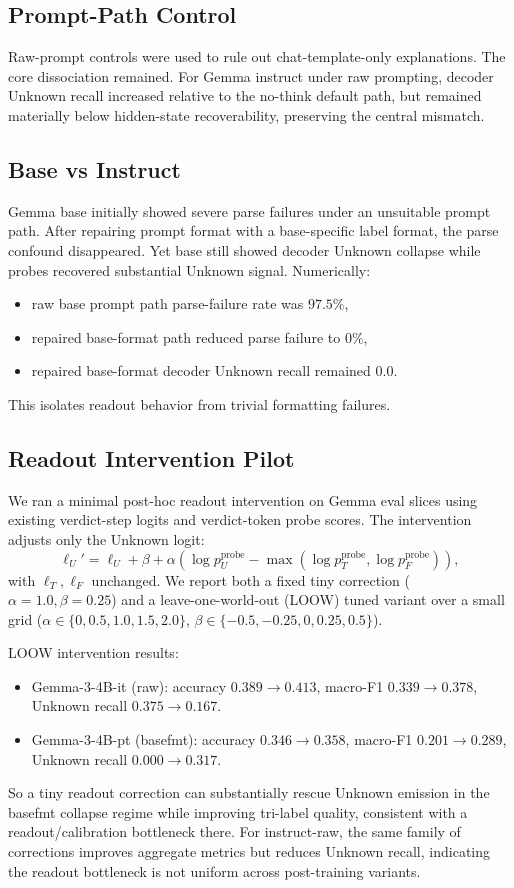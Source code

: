\documentclass[11pt]{article}
\begin{document}
\subsection{Prompt-Path Control}
Raw-prompt controls were used to rule out chat-template-only explanations.
The core dissociation remained.
For Gemma instruct under raw prompting, decoder Unknown recall increased relative to the no-think default path, but remained materially below hidden-state recoverability, preserving the central mismatch.

\subsection{Base vs Instruct}
Gemma base initially showed severe parse failures under an unsuitable prompt path.
After repairing prompt format with a base-specific label format, the parse confound disappeared.
Yet base still showed decoder Unknown collapse while probes recovered substantial Unknown signal.
Numerically:
\begin{itemize}
  \item raw base prompt path parse-failure rate was \(97.5\%\),
  \item repaired base-format path reduced parse failure to \(0\%\),
  \item repaired base-format decoder Unknown recall remained \(0.0\).
\end{itemize}
This isolates readout behavior from trivial formatting failures.

\subsection{Readout Intervention Pilot}
We ran a minimal post-hoc readout intervention on Gemma eval slices using existing verdict-step logits and verdict-token probe scores.
The intervention adjusts only the Unknown logit:
\[
\ell_U' = \ell_U + \beta + \alpha\left(\log p_U^{\text{probe}} - \max(\log p_T^{\text{probe}},\log p_F^{\text{probe}})\right),
\]
with \(\ell_T,\ell_F\) unchanged.
We report both a fixed tiny correction (\(\alpha=1.0,\beta=0.25\)) and a leave-one-world-out (LOOW) tuned variant over a small grid (\(\alpha\in\{0,0.5,1.0,1.5,2.0\}\), \(\beta\in\{-0.5,-0.25,0,0.25,0.5\}\)).

LOOW intervention results:
\begin{itemize}
  \item Gemma-3-4B-it (raw): accuracy \(0.389\to0.413\), macro-F1 \(0.339\to0.378\), Unknown recall \(0.375\to0.167\).
  \item Gemma-3-4B-pt (basefmt): accuracy \(0.346\to0.358\), macro-F1 \(0.201\to0.289\), Unknown recall \(0.000\to0.317\).
\end{itemize}
So a tiny readout correction can substantially rescue Unknown emission in the basefmt collapse regime while improving tri-label quality, consistent with a readout/calibration bottleneck there.
For instruct-raw, the same family of corrections improves aggregate metrics but reduces Unknown recall, indicating the readout bottleneck is not uniform across post-training variants.
\end{document}
